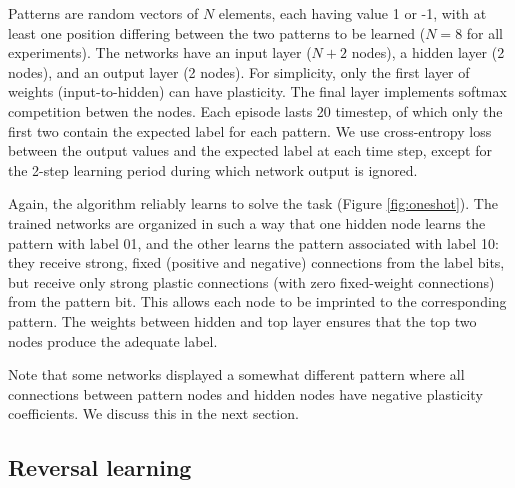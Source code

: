 \documentclass{article}
\begin{document}
 Patterns are random vectors of $N$ elements, each having
value 1 or -1, with at least one position differing between the two patterns to
be learned ($N=8$ for all experiments). The networks have an input layer ($N+2$ nodes), a hidden layer (2 nodes), and an
output layer (2 nodes). For simplicity, only the first layer of weights
(input-to-hidden) can have plasticity. The final layer implements softmax
competition betwen the nodes. Each episode lasts 20 timestep, of which only the first
two contain the expected label for each pattern. We use cross-entropy loss
between the output values and the expected label at each time step, except for
the 2-step learning period during which network output is ignored.


Again, the algorithm reliably learns to solve the task (Figure
\ref{fig:oneshot}). The trained networks are
organized in such a way that one hidden node learns the pattern with label 01,
and the other learns the pattern associated with label 10: they receive strong,
fixed (positive and negative) connections from the label bits, but receive only
strong plastic connections (with zero fixed-weight connections) from the pattern
bit. This allows each node to be imprinted to the corresponding pattern. The weights between hidden and top layer ensures that the top two nodes
produce the adequate label.

Note that some networks displayed a somewhat different pattern where all
connections between pattern nodes and hidden nodes have negative plasticity
coefficients. We discuss this in the next section.

\subsection{Reversal learning}
\end{document}
